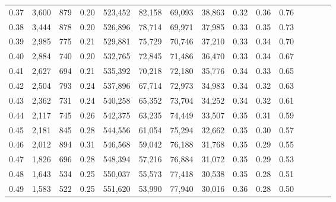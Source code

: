 \begin{tabular}{rrrcrrrrrrrrrrr}
0.37 &   3,600 &    879 &                                       0.20 &  523,452 &   82,158 &   69,093 &   38,863 &  0.32 &  0.36 &                         0.76 \\
0.38 &   3,444 &    878 &                                       0.20 &  526,896 &   78,714 &   69,971 &   37,985 &  0.33 &  0.35 &                         0.73 \\
0.39 &   2,985 &    775 &                                       0.21 &  529,881 &   75,729 &   70,746 &   37,210 &  0.33 &  0.34 &                         0.70 \\
0.40 &   2,884 &    740 &                                       0.20 &  532,765 &   72,845 &   71,486 &   36,470 &  0.33 &  0.34 &                         0.67 \\
0.41 &   2,627 &    694 &                                       0.21 &  535,392 &   70,218 &   72,180 &   35,776 &  0.34 &  0.33 &                         0.65 \\
0.42 &   2,504 &    793 &                                       0.24 &  537,896 &   67,714 &   72,973 &   34,983 &  0.34 &  0.32 &                         0.63 \\
0.43 &   2,362 &    731 &                                       0.24 &  540,258 &   65,352 &   73,704 &   34,252 &  0.34 &  0.32 &                         0.61 \\
0.44 &   2,117 &    745 &                                       0.26 &  542,375 &   63,235 &   74,449 &   33,507 &  0.35 &  0.31 &                         0.59 \\
0.45 &   2,181 &    845 &                                       0.28 &  544,556 &   61,054 &   75,294 &   32,662 &  0.35 &  0.30 &                         0.57 \\
0.46 &   2,012 &    894 &                                       0.31 &  546,568 &   59,042 &   76,188 &   31,768 &  0.35 &  0.29 &                         0.55 \\
0.47 &   1,826 &    696 &                                       0.28 &  548,394 &   57,216 &   76,884 &   31,072 &  0.35 &  0.29 &                         0.53 \\
0.48 &   1,643 &    534 &                                       0.25 &  550,037 &   55,573 &   77,418 &   30,538 &  0.35 &  0.28 &                         0.51 \\
0.49 &   1,583 &    522 &                                       0.25 &  551,620 &   53,990 &   77,940 &   30,016 &  0.36 &  0.28 &                         0.50 \\

\end{tabular}
